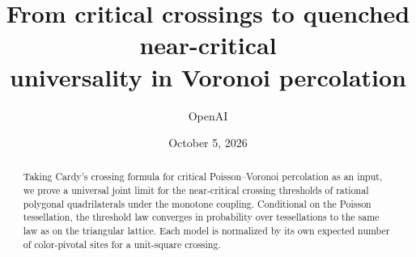 \documentclass[11pt]{article}
\title{From critical crossings to quenched near-critical\\universality in Voronoi percolation}
\author{OpenAI}
\date{October 5, 2026}
\theoremstyle{definition}
\begin{document}
\maketitle
\begin{abstract}
Taking Cardy's crossing formula for critical Poisson--Voronoi
percolation as an input, we prove a universal joint limit for the
near-critical crossing thresholds of rational polygonal quadrilaterals
under the monotone coupling. Conditional on the Poisson tessellation,
the threshold law converges in probability over tessellations to the same
law as on the triangular lattice. Each model is normalized by its own
expected number of color-pivotal sites for a unit-square crossing.
\end{abstract}








\end{document}

